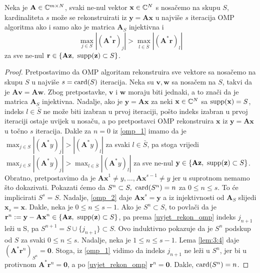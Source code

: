 \documentclass[a4paper,twoside,12pt]{memoir} %
\newcommand{\vect}[1]{\mathbf{#1}}
\renewcommand{\vec}{\vect}
\newcommand{\card}{\text{\normalfont{card}}}
\newcommand{\supp}{\text{\normalfont{supp}}}
\begin{document}
\begin{prop}\label{prop:3:5}
    Neka je $\vec A \in \C^{m \times N}$, svaki ne-nul vektor $\vec x \in \C^N$ s nosa\v{c}emo na skupu $S$, kardinaliteta $s$ mo\v{z}e se rekonstruirati iz $\vec y = \vec{Ax}$ u najvi\v{s}e $s$ iteracija OMP algoritma ako i samo ako je matrica $\vec A_S$ injektivna i 
    \begin{equation}\label{uvjet_rekon_omp}
        \max_{j \in S}|(\vec A^* \vec r)_j| > \max_{l \in \bar{S}}|(\vec A^* \vec r)_l|
    \end{equation}
    za sve ne-nul $\vec r \in \{\vec{Az},\ \supp(\vec z) \subset S\}$.
\end{prop}
\begin{proof}
    Pretpostavimo da OMP algoritam rekonstruira sve vektore sa nosa\v{c}emo na skupu $S$ u najvi\v{s}e $s = \card(S)$ iteracija. Neka su $\vec v, \vec w$ sa nosa\v{c}em na $S$, takvi da je $\vec{Av}=\vec{Aw}$. Zbog pretpostavke, $\vec v$ i $\vec w$ moraju biti jednaki, a to zna\v{c}i da je matrica $\vec A_S$ injektivna. Nadalje, ako je $\vec y = \vec{Ax}$ za neki $\vec x \in \C^N$ sa $\supp(\vec x)=S$, indeks $l \in \bar S$ ne mo\v{z}e biti izabran u prvoj iteraciji, po\v{s}to indeks izabran u prvoj iteraciji ostaje uvijek u nosa\v{c}u, a po pretpostavci OMP rekonstruira $\vec x$ iz $\vec y = \vec{Ax}$ u to\v{c}no $s$ iteracija. Dakle za $n=0$ iz \eqref{omp_1} imamo da je $\max_{j \in S}|(\vec A^*y)_j| > |(\vec A^*y)_l|$ za svaki $l \in \bar{S}$, pa stoga vrijedi $\max_{j \in S}|(\vec A^*y)_j| > \max_{l \in \bar{S}}|(\vec A^*y)_l|$ za sve ne-nul $\vec y \in \{\vec{Az},\ \supp(\vec z) \subset S\}$. \\
    \indent
    Obratno, pretpostavimo da je $\vec{Ax}^1 \neq y,\dots,\vec{Ax}^{s-1} \neq y$ jer u suprotnom nemamo \v{s}to dokazivati. Pokazati \'cemo da $S^n \subset S,\ \card(S^n)=n$ za $0 \leq n \leq s$. To \'ce implicirati $S^s = S$. Nadalje, \eqref{omp_2} daje $\vec{Ax}^s = \vec y$ a iz injektivnosti od $\vec{A}_S$ slijedi $\vec x_s = \vec{x}$. Dakle, neka je $0 \leq n \leq s-1$. Ako je $S^n \subset S$, to povla\v{c}i da je $\vec r^n := \vec y - \vec{Ax}^n \in \{\vec{Az},\ \supp(\vec z) \subset S\}$, pa prema \eqref{uvjet_rekon_omp} indeks $j_{n+1}$ le\v{z}i u S, pa $S^{n+1} = S \cup \{j_{n+1}\} \subset S$. Ovo induktivno pokazuje da je $S^n$ podskup od $S$ za svaki $0 \leq n \leq s$. Nadalje, neka je $1 \leq n \leq s-1$. Lema \eqref{lem:3:4} daje $(\vec{A}^* \vec r^n)_{S^n} = \vec 0$. Stoga, iz \eqref{omp_1} vidimo da indeks $j_{n+1}$ ne le\v{z}i u $S^{n}$, jer bi u protivnom $\vec A^* \vec r^n = \vec 0$, a po \eqref{uvjet_rekon_omp} $\vec r^n = \vec 0$. Dakle, $\card(S^n)=n$.
\end{proof}
\end{document}
